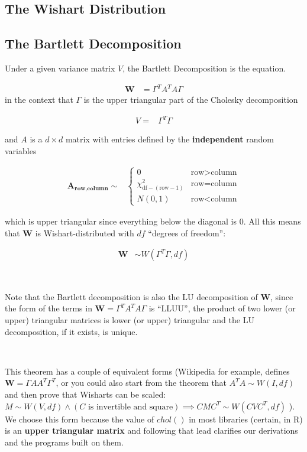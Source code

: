 \documentclass[english]{article}
\begin{document}
\subsection*{The Wishart Distribution}


\subsection*{The Bartlett Decomposition}

Under a given variance matrix $V$, the Bartlett Decomposition is
the equation.

\begin{align*}
\mathbf{W} & =\Gamma^{T}A^{T}A\Gamma
\end{align*}
in the context that $\Gamma$ is the upper triangular part of the
Cholesky decomposition

\begin{align*}
V= & \Gamma^{T}\Gamma
\end{align*}


and $A$ is a $d\times d$ matrix with entries defined by the \textbf{independent
}random variables

\begin{align*}
\mathbf{A_{\text{row},\text{column}}}\sim & \begin{cases}
0 & \text{row}>\text{column}\\
\chi_{\text{df}-(\text{row}-1)}^{2} & \text{row}=\text{column}\\
N(0,1) & \text{row}<\text{column}
\end{cases}
\end{align*}


which is upper triangular since everything below the diagonal is 0.
All this means that  $\mathbf{W}$ is Wishart-distributed with $df$
``degrees of freedom'':

\begin{align*}
\mathbf{W} & \sim W(\Gamma^{T}\Gamma,df)
\end{align*}


~

Note that the Bartlett decomposition is also the LU decomposition
of $\mathbf{W}$, since the form of the terms in $\mathbf{W}=\Gamma^{T}A^{T}A\Gamma$
is ``LLUU'', the product of two lower (or upper) triangular matrices
is lower (or upper) triangular and the LU decomposition, if it exists,
is unique.

~

This theorem has a couple of equivalent forms (Wikipedia  for example,
defines $\mathbf{W}=\Gamma AA^{T}\Gamma^{T}$, or you could also start
from the theorem that $A^{T}A\sim W(I,df)$ and then prove that Wisharts
can be scaled: $M\sim W(V,df)\wedge(C\text{ is invertible and square})\implies CMC^{T}\sim W(CVC^{T},df)$
). We choose this form because the value of $chol()$ in most libraries
(certain, in R) is an \textbf{upper triangular matrix} and following
that lead clarifies our derivations and the programs built on them.
\end{document}

